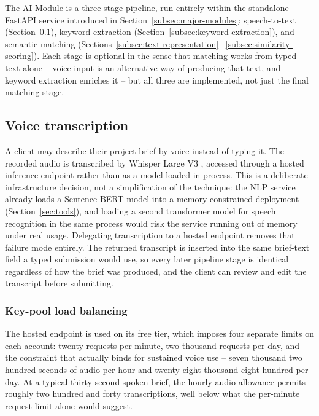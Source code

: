 
The AI Module is a three-stage pipeline, run entirely within the
standalone FastAPI service introduced in
Section~\ref{subsec:major-modules}: speech-to-text
(Section~\ref{subsec:voice-transcription}), keyword
extraction (Section~\ref{subsec:keyword-extraction}), and semantic
matching (Sections~\ref{subsec:text-representation}
--\ref{subsec:similarity-scoring}). Each stage is optional in the sense
that matching works from typed text alone -- voice input is an
alternative way of producing that text, and keyword extraction enriches
it -- but all three are implemented, not just the final matching stage.

\subsection{Voice transcription}
\label{subsec:voice-transcription}

A client may describe their project brief by voice instead of typing
it. The recorded audio is transcribed by Whisper Large V3
\cite{radford2022whisper}, accessed through a hosted inference endpoint
rather than as a model loaded in-process. This is a deliberate infrastructure decision, not a
simplification of the technique: the NLP service already loads a
Sentence-BERT model into a memory-constrained deployment
(Section~\ref{sec:tools}), and loading a second transformer model for
speech recognition in the same process would risk the service running
out of memory under real usage. Delegating transcription to a hosted
endpoint removes that failure mode entirely.
The returned transcript is inserted into the same brief-text field a
typed submission would use, so every later pipeline stage is identical
regardless of how the brief was produced, and the client can review and
edit the transcript before submitting.

\subsubsection*{Key-pool load balancing}

The hosted endpoint is used on its free tier, which imposes four
separate limits on each account: twenty requests per minute, two
thousand requests per day, and -- the constraint that actually binds for
sustained voice use -- seven thousand two hundred seconds of audio per
hour and twenty-eight thousand eight hundred per day. At a typical
thirty-second spoken brief, the hourly audio allowance permits roughly
two hundred and forty transcriptions, well below what the per-minute
request limit alone would suggest.

